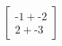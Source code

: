 \documentclass[preview]{standalone}
\begin{document}
\begin{align*}
\begin{bmatrix} \text{-}1 + \text{-}2 \\ 2 + \text{-}3 \end{bmatrix}
\end{align*}
\end{document}
